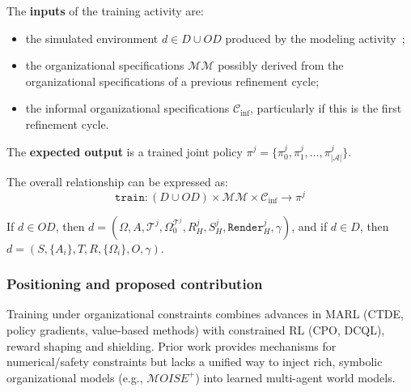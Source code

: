 \documentclass[pdflatex,sn-mathphys-num]{sn-jnl}%
\theoremstyle{thmstyleone}%
\theoremstyle{thmstyletwo}%
\theoremstyle{thmstylethree}%
\begin{document}
The \textbf{inputs} of the training activity are:
\begin{itemize}
    \item the simulated environment $d \in D \cup OD$ produced by the modeling activity~;
    \item the organizational specifications $\mathcal{MM}$ possibly derived from the organizational specifications of a previous refinement cycle;
    \item the informal organizational specifications $\mathcal{C}_{\text{inf}}$, particularly if this is the first refinement cycle.
\end{itemize}

\noindent
The \textbf{expected output} is a trained joint policy $\pi^j = \{\pi^j_0, \pi^j_1, \dots, \pi^j_{|\mathcal{A}|}\}$.

\medskip
\noindent

\noindent The overall relationship can be expressed as:
\begin{displaymath}
    \texttt{train}: (D \cup OD) \times \mathcal{MM} \times \mathcal{C}_{\text{inf}} \rightarrow \pi^j
\end{displaymath}

If $d \in OD$, then $d = (\Omega, A, \mathcal{T}^j, \Omega^{\mathcal{T}^j}_0, R^j_H, S^j_H, \texttt{Render}^j_H, \gamma)$, and if $d \in D$, then $d = (S,\{A_i\},T,R,\{\Omega_i\}, \allowbreak O,\gamma)$.


\subsubsection*{Positioning and proposed contribution}

Training under organizational constraints combines advances in MARL (CTDE, policy gradients, value-based methods) with constrained RL (CPO, DCQL), reward shaping and shielding. Prior work provides mechanisms for numerical/safety constraints but lacks a unified way to inject rich, symbolic organizational models (e.g., $\mathcal{M}OISE^+$) into learned multi-agent world models.
\end{document}
